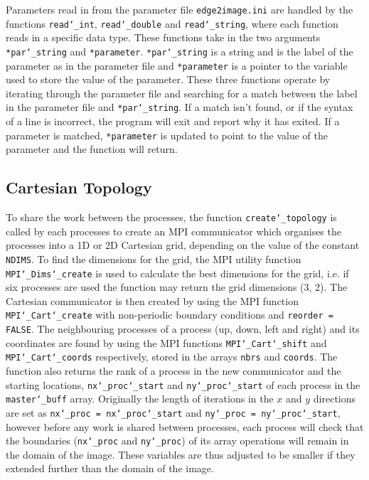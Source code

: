 \documentclass[11pt, a4paper]{article}
\begin{document}
			Parameters read in from the parameter file \texttt{edge2image.ini} are handled by the functions \texttt{read\char`_int}, \texttt{read\char`_double} and \texttt{read\char`_string}, where each function reads in a specific data type. These functions take in the two arguments \texttt{*par\char`_string} and \texttt{*parameter}. \texttt{*par\char`_string} is a string and is the label of the parameter as in the parameter file and \texttt{*parameter} is a pointer to the variable used to store the value of the parameter. These three functions operate by iterating through the parameter file and searching for a match between the label in the parameter file and \texttt{*par\char`_string}. If a match isn't found, or if the syntax of a line is incorrect, the program will exit and report why it has exited. If a parameter is matched, \texttt{*parameter} is updated to point to the value of the parameter and the function will return.
			
	
		\subsection{Cartesian Topology}
			To share the work between the processes, the function \texttt{create\char`_topology} is called by each processes to create an MPI communicator which organises the processes into a 1D or 2D Cartesian grid, depending on the value of the constant \texttt{NDIMS}. To find the dimensions for the grid, the MPI utility function \texttt{MPI\char`_Dims\char`_create} is used to calculate the best dimensions for the grid, i.e. if six processes are used the function may return the grid dimensions  (3, 2). The Cartesian communicator is then created by using the MPI function \texttt{MPI\char`_Cart\char`_create} with non-periodic boundary conditions and \texttt{reorder = FALSE}. The neighbouring processes of a process (up, down, left and right) and its coordinates are found by using the MPI functions \texttt{MPI\char`_Cart\char`_shift} and \texttt{MPI\char`_Cart\char`_coords} respectively, stored in the arrays \texttt{nbrs} and \texttt{coords}. The function also returns the rank of a process in the new communicator and the starting locations, \texttt{nx\char`_proc\char`_start} and \texttt{ny\char`_proc\char`_start} of each process in the \texttt{master\char`_buff} array. Originally the length of iterations in the $x$ and $y$ directions are set as \texttt{nx\char`_proc = nx\char`_proc\char`_start} and \texttt{ny\char`_proc = ny\char`_proc\char`_start}, however before any work is shared between processes, each process will check that the boundaries (\texttt{nx\char`_proc} and \texttt{ny\char`_proc}) of its array operations will remain in the domain of the image. These variables are thus adjusted to be smaller if they extended further than the domain of the image.
	
\end{document}
